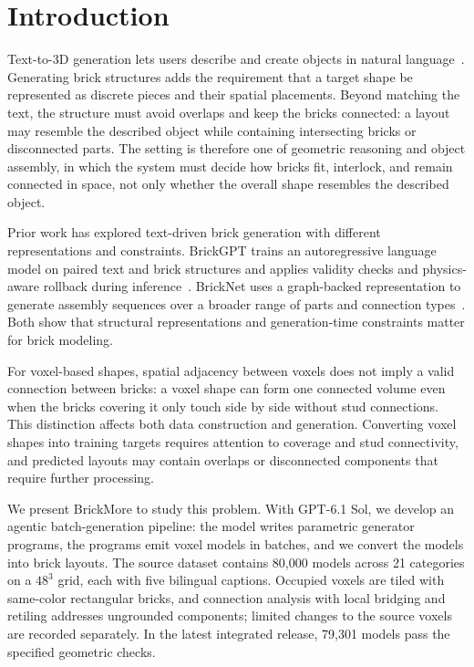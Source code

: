 \documentclass[letterpaper]{article} %
\begin{document}
\section{Introduction}
Text-to-3D generation lets users describe and create objects in natural language~\cite{dreamfusion}. Generating brick structures adds the requirement that a target shape be represented as discrete pieces and their spatial placements. Beyond matching the text, the structure must avoid overlaps and keep the bricks connected: a layout may resemble the described object while containing intersecting bricks or disconnected parts. The setting is therefore one of geometric reasoning and object assembly, in which the system must decide how bricks fit, interlock, and remain connected in space, not only whether the overall shape resembles the described object.

Prior work has explored text-driven brick generation with different representations and constraints. BrickGPT trains an autoregressive language model on paired text and brick structures and applies validity checks and physics-aware rollback during inference~\cite{brickgpt}. BrickNet uses a graph-backed representation to generate assembly sequences over a broader range of parts and connection types~\cite{bricknet}. Both show that structural representations and generation-time constraints matter for brick modeling.

For voxel-based shapes, spatial adjacency between voxels does not imply a valid connection between bricks: a voxel shape can form one connected volume even when the bricks covering it only touch side by side without stud connections. This distinction affects both data construction and generation. Converting voxel shapes into training targets requires attention to coverage and stud connectivity, and predicted layouts may contain overlaps or disconnected components that require further processing.

We present BrickMore to study this problem. With GPT-6.1 Sol, we develop an agentic batch-generation pipeline: the model writes parametric generator programs, the programs emit voxel models in batches, and we convert the models into brick layouts. The source dataset contains 80,000 models across 21 categories on a $48^3$ grid, each with five bilingual captions. Occupied voxels are tiled with same-color rectangular bricks, and connection analysis with local bridging and retiling addresses ungrounded components; limited changes to the source voxels are recorded separately. In the latest integrated release, 79,301 models pass the specified geometric checks.
\end{document}
